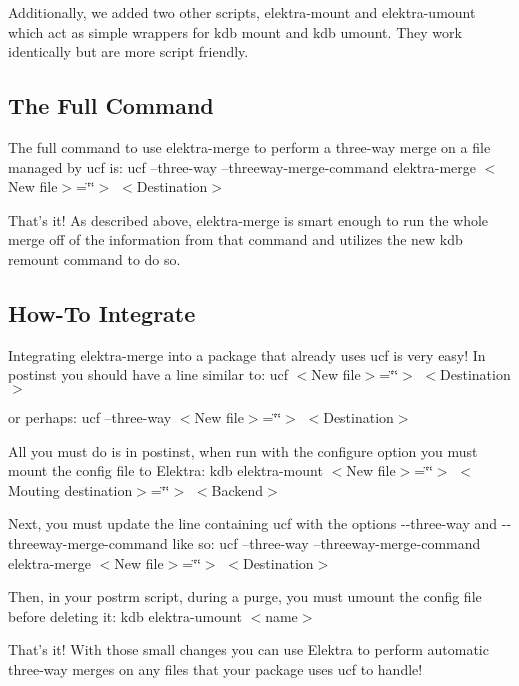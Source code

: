 Additionally, we added two other scripts, {\ttfamily elektra-\/mount} and {\ttfamily elektra-\/umount} which act as simple wrappers for {\ttfamily kdb mount} and {\ttfamily kdb umount}. They work identically but are more script friendly.

\subsection*{The Full Command}

The full command to use {\ttfamily elektra-\/merge} to perform a three-\/way merge on a file managed by ucf is\+: ucf --three-\/way --threeway-\/merge-\/command elektra-\/merge $<$\+New file$>$=\char`\"{}\char`\"{}$>$ $<$\+Destination$>$

That's it! As described above, {\ttfamily elektra-\/merge} is smart enough to run the whole merge off of the information from that command and utilizes the new {\ttfamily kdb remount} command to do so.

\subsection*{How-\/\+To Integrate}

Integrating {\ttfamily elektra-\/merge} into a package that already uses ucf is very easy! In {\ttfamily postinst} you should have a line similar to\+: ucf $<$\+New file$>$=\char`\"{}\char`\"{}$>$ $<$\+Destination$>$

or perhaps\+: ucf --three-\/way $<$\+New file$>$=\char`\"{}\char`\"{}$>$ $<$\+Destination$>$

All you must do is in {\ttfamily postinst}, when run with the {\ttfamily configure} option you must mount the config file to Elektra\+: kdb elektra-\/mount $<$\+New file$>$=\char`\"{}\char`\"{}$>$ $<$\+Mouting destination$>$=\char`\"{}\char`\"{}$>$ $<$\+Backend$>$

Next, you must update the line containing {\ttfamily ucf} with the options {\ttfamily -\/-\/three-\/way} and {\ttfamily -\/-\/threeway-\/merge-\/command} like so\+: ucf --three-\/way --threeway-\/merge-\/command elektra-\/merge $<$\+New file$>$=\char`\"{}\char`\"{}$>$ $<$\+Destination$>$

Then, in your {\ttfamily postrm} script, during a purge, you must umount the config file before deleting it\+: kdb elektra-\/umount $<$name$>$

That's it! With those small changes you can use Elektra to perform automatic three-\/way merges on any files that your package uses ucf to handle!

